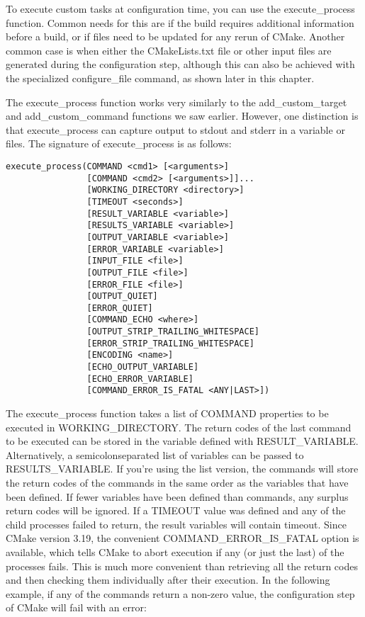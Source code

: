 To execute custom tasks at configuration time, you can use the execute\_process function. Common needs for this are if the build requires additional information before a build, or if files need to be updated for any rerun of CMake. Another common case is when either the CMakeLists.txt file or other input files are generated during the configuration step, although this can also be achieved with the specialized configure\_file command, as shown later in this chapter.

The execute\_process function works very similarly to the add\_custom\_target and add\_custom\_command functions we saw earlier. However, one distinction is that execute\_process can capture output to stdout and stderr in a variable or files. The signature of execute\_process is as follows:

\begin{lstlisting}[style=styleCMake]
execute_process(COMMAND <cmd1> [<arguments>]
				[COMMAND <cmd2> [<arguments>]]...
				[WORKING_DIRECTORY <directory>]
				[TIMEOUT <seconds>]
				[RESULT_VARIABLE <variable>]
				[RESULTS_VARIABLE <variable>]
				[OUTPUT_VARIABLE <variable>]
				[ERROR_VARIABLE <variable>]
				[INPUT_FILE <file>]
				[OUTPUT_FILE <file>]
				[ERROR_FILE <file>]
				[OUTPUT_QUIET]
				[ERROR_QUIET]
				[COMMAND_ECHO <where>]
				[OUTPUT_STRIP_TRAILING_WHITESPACE]
				[ERROR_STRIP_TRAILING_WHITESPACE]
				[ENCODING <name>]
				[ECHO_OUTPUT_VARIABLE]
				[ECHO_ERROR_VARIABLE]
				[COMMAND_ERROR_IS_FATAL <ANY|LAST>])
\end{lstlisting}

The execute\_process function takes a list of COMMAND properties to be executed in WORKING\_DIRECTORY. The return codes of the last command to be executed can be stored in the variable defined with RESULT\_VARIABLE. Alternatively, a semicolonseparated list of variables can be passed to RESULTS\_VARIABLE. If you're using the list version, the commands will store the return codes of the commands in the same order as the variables that have been defined. If fewer variables have been defined than commands, any surplus return codes will be ignored. If a TIMEOUT value was defined and any of the child processes failed to return, the result variables will contain timeout. Since CMake version 3.19, the convenient COMMAND\_ERROR\_IS\_FATAL option is available, which tells CMake to abort execution if any (or just the last) of the processes fails. This is much more convenient than retrieving all the return codes and then checking them individually after their execution. In the following example, if any of the commands return a non-zero value, the configuration step of CMake will fail with an error:

